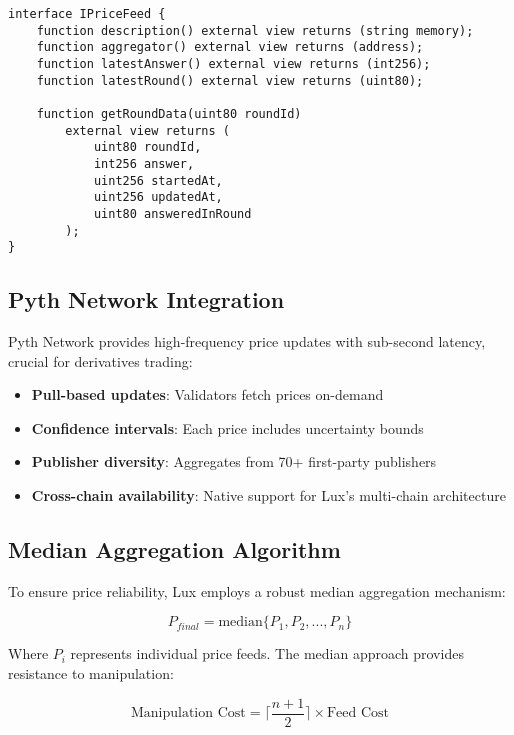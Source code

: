 \documentclass[11pt]{article}
\begin{document}
\begin{lstlisting}[caption={Chainlink Price Feed Interface}]
interface IPriceFeed {
    function description() external view returns (string memory);
    function aggregator() external view returns (address);
    function latestAnswer() external view returns (int256);
    function latestRound() external view returns (uint80);
    
    function getRoundData(uint80 roundId) 
        external view returns (
            uint80 roundId,
            int256 answer,
            uint256 startedAt,
            uint256 updatedAt,
            uint80 answeredInRound
        );
}
\end{lstlisting}

\subsection{Pyth Network Integration}

Pyth Network provides high-frequency price updates with sub-second latency, crucial for derivatives trading:

\begin{itemize}
    \item \textbf{Pull-based updates}: Validators fetch prices on-demand
    \item \textbf{Confidence intervals}: Each price includes uncertainty bounds
    \item \textbf{Publisher diversity}: Aggregates from 70+ first-party publishers
    \item \textbf{Cross-chain availability}: Native support for Lux's multi-chain architecture
\end{itemize}

\subsection{Median Aggregation Algorithm}

To ensure price reliability, Lux employs a robust median aggregation mechanism:

\begin{equation}
P_{final} = \text{median}\{P_1, P_2, ..., P_n\}
\end{equation}

Where $P_i$ represents individual price feeds. The median approach provides resistance to manipulation:

\begin{equation}
\text{Manipulation Cost} = \lceil \frac{n+1}{2} \rceil \times \text{Feed Cost}
\end{equation}
\end{document}
